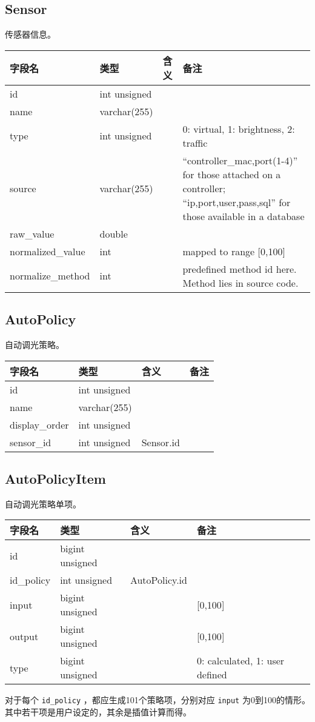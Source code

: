 \subsection{Sensor}\label{sensor}

传感器信息。

\begin{longtabu}[c]{@{}lXXX@{}}
\toprule
字段名 & 类型 & 含义 & 备注\tabularnewline
\midrule
\endhead
id & int unsigned & &\tabularnewline
name & varchar(255) & &\tabularnewline
type & int unsigned & & 0: virtual, 1: brightness, 2:
traffic\tabularnewline
source & varchar(255) & & ``controller\_mac,port(1-4)'' for those
attached on a controller; ``ip,port,user,pass,sql'' for those available
in a database\tabularnewline
raw\_value & double & &\tabularnewline
normalized\_value & int & & mapped to range {[}0,100{]}\tabularnewline
normalize\_method & int & & predefined method id here. Method lies in
source code.\tabularnewline
\bottomrule
\end{longtabu}

\subsection{AutoPolicy}\label{autopolicy}

自动调光策略。

\begin{longtabu}[c]{@{}lXXX@{}}
\toprule
字段名 & 类型 & 含义 & 备注\tabularnewline
\midrule
\endhead
id & int unsigned & &\tabularnewline
name & varchar(255) & &\tabularnewline
display\_order & int unsigned & &\tabularnewline
sensor\_id & int unsigned & Sensor.id &\tabularnewline
\bottomrule
\end{longtabu}

\subsection{AutoPolicyItem}\label{autopolicyitem}

自动调光策略单项。

\begin{longtabu}[c]{@{}lXXX@{}}
\toprule
字段名 & 类型 & 含义 & 备注\tabularnewline
\midrule
\endhead
id & bigint unsigned & &\tabularnewline
id\_policy & int unsigned & AutoPolicy.id &\tabularnewline
input & bigint unsigned & & {[}0,100{]}\tabularnewline
output & bigint unsigned & & {[}0,100{]}\tabularnewline
type & bigint unsigned & & 0: calculated, 1: user defined\tabularnewline
\bottomrule
\end{longtabu}

对于每个 \texttt{id\_policy} ，都应生成101个策略项，分别对应
\texttt{input}
为0到100的情形。其中若干项是用户设定的，其余是插值计算而得。
